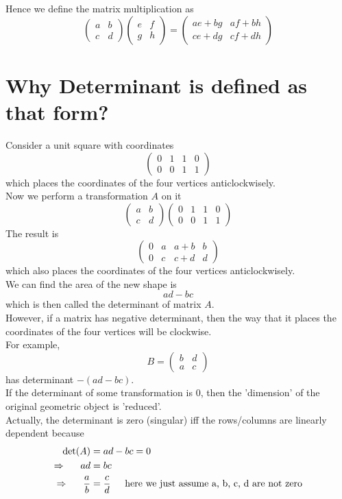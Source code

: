 \documentclass[12pt]{article}
\begin{document}
\indent Hence we define the matrix multiplication as \\
\[
\begin{pmatrix} a & b \\ c & d \end{pmatrix}
\begin{pmatrix} e & f \\ g & h \end{pmatrix} =
\begin{pmatrix} ae+bg & af+bh \\ ce+dg & cf+dh \end{pmatrix}
\]

\section{Why Determinant is defined as that form?}
Consider a unit square with coordinates
\[
\begin{pmatrix}
    0 & 1 & 1 & 0 \\
    0 & 0 & 1 & 1
\end{pmatrix}
\]
\indent which places the coordinates of the four vertices anticlockwisely.\\
\indent Now we perform a transformation $A$ on it 
\[
\begin{pmatrix} a & b \\ c & d \end{pmatrix}
\begin{pmatrix} 0 & 1 & 1 & 0 \\ 0 & 0 & 1 & 1 \end{pmatrix}
\]
\indent The result is
\[
\begin{pmatrix} 0 & a & a+b & b \\ 0 & c & c+d & d \end{pmatrix}
\]
\indent which also places the coordinates of the four vertices anticlockwisely.\\
\indent We can find the area of the new shape is 
\[
ad - bc
\]
\indent which is then called the determinant of matrix $A$. \\
\indent However, if a matrix has negative determinant, then the way that it places the coordinates of the four vertices will be clockwise. \\
\indent For example, \\
\[
B = \begin{pmatrix} b & d \\ a & c \end{pmatrix}
\]
\indent has determinant $-(ad-bc)$. \\
\indent If the determinant of some transformation is $0$, then the 'dimension' of the original geometric object is 'reduced'. \\
\indent Actually, the determinant is zero (singular) iff the rows/columns are linearly dependent because
\begin{align*}
\det(A) &= ad - bc = 0 \\
\Rightarrow \indent ad &= bc \\
\Rightarrow \indent \frac{a}{b} &= \frac{c}{d} \indent \text{here we just assume a, b, c, d are not zero}\\
\end{align*}
\end{document}
